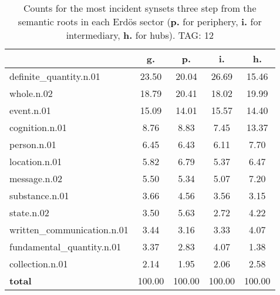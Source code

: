 \begin{table}[h!]
\begin{center}
\begin{tabular}{| l || c | c | c | c |}\hline
 & {\bf g.} & {\bf p.} & {\bf i.} & {\bf h.} \\\hline\hline
definite\_quantity.n.01 & 23.50  & 20.04  & 26.69  & 15.46 \\\hline
whole.n.02 & 18.79  & 20.41  & 18.02  & 19.99 \\\hline
event.n.01 & 15.09  & 14.01  & 15.57  & 14.40 \\\hline
cognition.n.01 & 8.76  & 8.83  & 7.45  & 13.37 \\\hline
person.n.01 & 6.45  & 6.43  & 6.11  & 7.70 \\\hline
location.n.01 & 5.82  & 6.79  & 5.37  & 6.47 \\\hline
message.n.02 & 5.50  & 5.34  & 5.07  & 7.20 \\\hline
substance.n.01 & 3.66  & 4.56  & 3.56  & 3.15 \\\hline
state.n.02 & 3.50  & 5.63  & 2.72  & 4.22 \\\hline
written\_communication.n.01 & 3.44  & 3.16  & 3.33  & 4.07 \\\hline
fundamental\_quantity.n.01 & 3.37  & 2.83  & 4.07  & 1.38 \\\hline
collection.n.01 & 2.14  & 1.95  & 2.06  & 2.58 \\\hline\hline
{{\bf total}} & 100.00  & 100.00  & 100.00  & 100.00 \\\hline
\end{tabular}
\caption{Counts for the most incident synsets three step from the semantic roots in each Erd\"os sector ({\bf p.} for periphery, {\bf i.} for intermediary, {\bf h.} for hubs). TAG: 12}
\end{center}
\end{table}